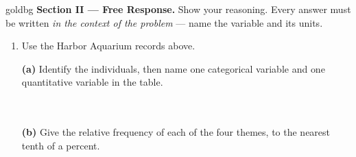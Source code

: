 \documentclass[12pt]{article}
\begin{document}
\begin{enumerate}[leftmargin=1.9em, itemsep=0.13in]
\end{enumerate}

\vspace{0.14in}

\boxguard[18]
\begin{headlinebox}{goldbg}
\small
\textbf{Section II --- Free Response.} Show your reasoning. Every answer must be written
\emph{in the context of the problem} --- name the variable and its units.
\end{headlinebox}

\vspace{0.10in}

\begin{enumerate}[leftmargin=1.9em, itemsep=0.16in, resume]

  \boxguard[16]
  \item Use the Harbor Aquarium records above.

        \vspace{6pt}
        \textbf{(a)} Identify the individuals, then name one categorical variable and one
        quantitative variable in the table.\\[4pt]
        \\
        \\

        \boxguard[15]
        \vspace{6pt}
        \textbf{(b)} Give the relative frequency of each of the four themes, to the nearest tenth
        of a percent.\\[4pt]
        \\


\end{enumerate}
\end{document}
